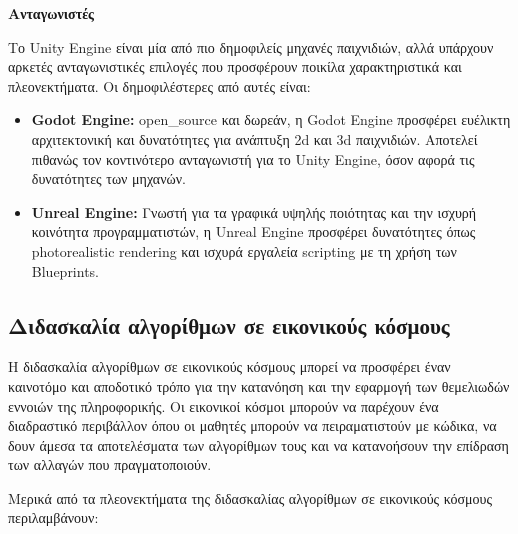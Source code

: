\textbf{Ανταγωνιστές}

Το Unity Engine είναι μία από πιο δημοφιλείς μηχανές παιχνιδιών, αλλά υπάρχουν αρκετές ανταγωνιστικές επιλογές που προσφέρουν ποικίλα χαρακτηριστικά και πλεονεκτήματα\cite{leroux_best_2023}. Οι δημοφιλέστερες από αυτές είναι:

\begin{itemize}
    \item \textbf{Godot Engine\cite{engine_godot_nodate}:} \Gls{open_source} και δωρεάν, η Godot Engine προσφέρει ευέλικτη αρχιτεκτονική και δυνατότητες για ανάπτυξη \acrshort{2d} και \acrshort{3d} παιχνιδιών. Αποτελεί πιθανώς τον κοντινότερο ανταγωνιστή για το Unity Engine, όσον αφορά τις δυνατότητες των μηχανών.
    \item \textbf{Unreal Engine\cite{noauthor_most_nodate}:} Γνωστή για τα γραφικά υψηλής ποιότητας και την ισχυρή κοινότητα προγραμματιστών, η Unreal Engine προσφέρει δυνατότητες όπως \gls{photorealistic} \gls{rendering} και ισχυρά εργαλεία scripting με τη χρήση των Blueprints.
\end{itemize}


\subsection{Διδασκαλία αλγορίθμων σε εικονικούς κόσμους}

Η διδασκαλία αλγορίθμων σε εικονικούς κόσμους μπορεί να προσφέρει έναν καινοτόμο και αποδοτικό τρόπο για την κατανόηση και την εφαρμογή των θεμελιωδών εννοιών της πληροφορικής. Οι εικονικοί κόσμοι μπορούν να παρέχουν ένα διαδραστικό περιβάλλον όπου οι μαθητές μπορούν να πειραματιστούν με κώδικα, να δουν άμεσα τα αποτελέσματα των αλγορίθμων τους και να κατανοήσουν την επίδραση των αλλαγών που πραγματοποιούν.

Μερικά από τα πλεονεκτήματα της διδασκαλίας αλγορίθμων σε εικονικούς κόσμους περιλαμβάνουν:

